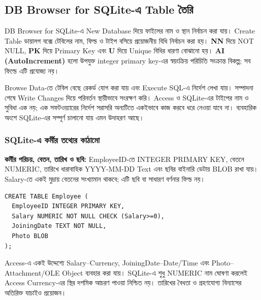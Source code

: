 \subsection{DB Browser for SQLite-এ Table তৈরি}
DB Browser for SQLite-এ New Database দিয়ে ফাইলের নাম ও স্থান নির্বাচন করা যায়। Create Table ডায়ালগ বক্সে টেবিলের নাম, ফিল্ড ও টাইপ বসিয়ে প্রয়োজনীয় বিধি নির্বাচন করা হয়। \textbf{NN} দিয়ে NOT NULL, \textbf{PK} দিয়ে Primary Key এবং \textbf{U} দিয়ে Unique বিধির ধারণা বোঝানো হয়। \textbf{AI (AutoIncrement)} হলো উপযুক্ত integer primary key-এর স্বয়ংক্রিয় পরিচিতি সংক্রান্ত বিকল্প; সব ফিল্ডে এটি প্রযোজ্য নয়।

Browse Data-তে টেবিল বেছে রেকর্ড যোগ করা যায় এবং Execute SQL-এ নির্দেশ লেখা যায়। সম্পাদনা শেষে Write Changes দিয়ে পরিবর্তন স্থায়ীভাবে সংরক্ষণ করি। Access ও SQLite-এর টাইপের নাম ও সুবিধা এক নয়; এক সফটওয়্যারের নির্দেশ সরাসরি অন্যটিতে একইভাবে কাজ করবে ধরে নেওয়া যাবে না। ব্যবহারিক অংশে SQLite-এর সম্পূর্ণ চালানো যায় এমন উদাহরণ আছে।

\subsubsection{SQLite-এ কর্মীর তথ্যের কাঠামো}
\textbf{কর্মীর পরিচয়, বেতন, তারিখ ও ছবি:} EmployeeID-তে INTEGER PRIMARY KEY, বেতনে NUMERIC, তারিখে ধারাবাহিক YYYY-MM-DD Text এবং ছবির বাইনারি ডেটায় BLOB রাখা যায়। Salary-তে একই মুদ্রায় বেতনের সংখ্যামান থাকবে; এটি ছবি বা সাধারণ বর্ণনার ফিল্ড নয়।
\begin{verbatim}
CREATE TABLE Employee (
  EmployeeID INTEGER PRIMARY KEY,
  Salary NUMERIC NOT NULL CHECK (Salary>=0),
  JoiningDate TEXT NOT NULL,
  Photo BLOB
);
\end{verbatim}
Access-এ একই উদ্দেশ্যে Salary--Currency, JoiningDate--Date/Time এবং Photo--Attachment/OLE Object ব্যবহার করা যায়। SQLite-এ শুধু NUMERIC নাম ঘোষণা করলেই Access Currency-এর স্থির দশমিক আচরণ পাওয়া নিশ্চিত নয়। তারিখের বৈধতা ও গ্রহণযোগ্য বিন্যাসের অতিরিক্ত যাচাইও প্রয়োজন।

